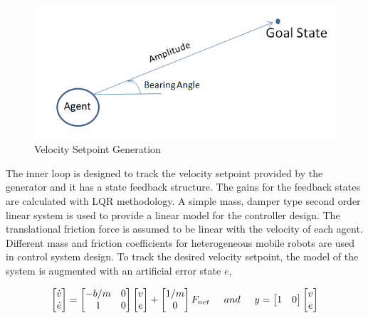 \begin{figure}[H]
\caption{Velocity Setpoint Generation} \label{velocity_sp_generation}
\centering
\includegraphics[scale = 0.50]{bearing}
\end{figure}

The inner loop is designed to track the velocity setpoint provided by the generator and it has a state feedback structure. The gains for the feedback states are calculated with LQR methodology. A simple mass, damper type second order linear system is used to provide a linear model for the controller design. The translational friction force is assumed to be linear with the velocity of each agent. Different mass and friction coefficients for heterogeneous mobile robots are used in control system design. To track the desired velocity setpoint, the model of the system is augmented with an artificial error state $e$,

\begin{equation} \label{dynamic_system}
\begin{bmatrix}
\dot{v} \\ \dot{e}
\end{bmatrix}
=
\begin{bmatrix}
-b/m & 0 \\
1 & 0
\end{bmatrix}
\begin{bmatrix}
v \\ e
\end{bmatrix}
+ \begin{bmatrix}
1/m \\ 0
\end{bmatrix}
F_{net} \hspace{0.5cm} and
\hspace{0.5cm}
y = \begin{bmatrix}
1 & 0
\end{bmatrix}
\begin{bmatrix}
v \\ e
\end{bmatrix}
\end{equation}

